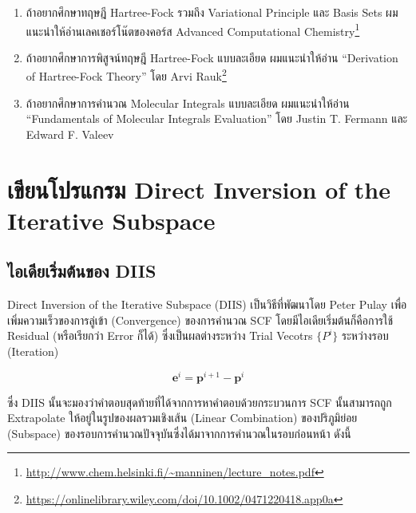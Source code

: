\begin{enumerate}[topsep=0pt,noitemsep]
  \setlength\itemsep{1em}
  \item ถ้าอยากศึกษาทฤษฎี Hartree-Fock รวมถึง Variational Principle และ Basis Sets ผมแนะนำให้อ่านเลคเชอร์โน๊ตของคอร์ส
        Advanced Computational Chemistry\footnote{\url{http://www.chem.helsinki.fi/~manninen/lecture_notes.pdf}}

  \item ถ้าอยากศึกษาการพิสูจน์ทฤษฎี Hartree-Fock แบบละเอียด ผมแนะนำให้อ่าน \enquote{Derivation of Hartree-Fock Theory}
        โดย Arvi Rauk\footnote{\url{https://onlinelibrary.wiley.com/doi/10.1002/0471220418.app0a}}

  \item ถ้าอยากศึกษาการคำนวณ Molecular Integrals แบบละเอียด ผมแนะนำให้อ่าน \enquote{Fundamentals of Molecular
          Integrals Evaluation} โดย Justin T. Fermann และ Edward F. Valeev
\end{enumerate}

\section{เขียนโปรแกรม Direct Inversion of the Iterative Subspace}

\subsection{ไอเดียเริ่มต้นของ DIIS}

Direct Inversion of the Iterative Subspace (DIIS) เป็นวิธีที่พัฒนาโดย Peter Pulay เพื่อเพิ่มความเร็วของการลู่เข้า (Convergence)
ของการคำนวณ SCF\autocite{pulay1980} โดยมีไอเดียเริ่มต้นก็คือการใช้ Residual (หรือเรียกว่า Error ก็ได้) ซึ่งเป็นผลต่างระหว่าง
Trial Vecotrs $\{ P^{i}\}$ ระหว่างรอบ (Iteration)

\begin{equation}
  \mathbf{e}^i
  =
  \mathbf{p}^{i+1} - \mathbf{p}^i
\end{equation}

\noindent ซึ่ง DIIS นั้นจะมองว่าคำตอบสุดท้ายที่ได้จากการหาคำตอบด้วยกระบวนการ SCF นั้นสามารถถูก Extrapolate ให้อยู่ในรูปของผลรวมเชิงเส้น
(Linear Combination) ของปริภูมิย่อย (Subspace) ของรอบการคำนวณปัจจุบันซึ่งได้มาจากการคำนวณในรอบก่อนหน้า ดังนี้

